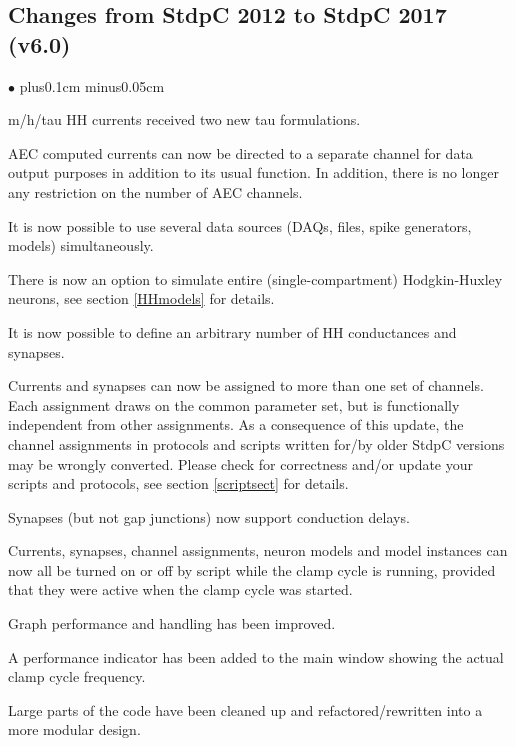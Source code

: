 \documentclass{article}
\newenvironment{myitem}{\begin{list}{$\bullet$}{\setlength{\leftmargin}{1.1em}
\itemsep0.1cm plus0.1cm minus0.05cm
\listparindent0cm
\addtolength{\labelsep}{0.5\labelsep}
\setlength{\labelwidth}{0.8em}
\setlength{\leftmargin}{\labelwidth}
\addtolength{\leftmargin}{\labelsep}
}}{\end{list}}
\begin{document}
\subsection{Changes from StdpC 2012 to StdpC 2017 (v6.0)}
\begin{myitem}
\item m/h/tau HH currents received two new tau formulations.
\item AEC computed currents can now be directed to a separate channel for data output
 purposes in addition to its usual function. In addition, there is no longer any restriction
 on the number of AEC channels.
\item It is now possible to use several data sources (DAQs, files, spike generators, models) simultaneously.
\item There is now an option to simulate entire (single-compartment) Hodgkin-Huxley neurons, see
 section \ref{HHmodels} for details.
\item It is now possible to define an arbitrary number of HH conductances and synapses.
\item Currents and synapses can now be assigned to more than one set of channels.
 Each assignment draws on the common parameter set, but is functionally independent
 from other assignments. As a consequence of this update, the channel assignments
 in protocols and scripts written for/by older StdpC versions may be wrongly converted.
 Please check for correctness and/or update your scripts and protocols, see section \ref{scriptsect} for details.
\item Synapses (but not gap junctions) now support conduction delays.
\item Currents, synapses, channel assignments, neuron models and model instances can now all be
 turned on or off by script while the clamp cycle is running, provided that they were active when
 the clamp cycle was started.
\item Graph performance and handling has been improved.
\item A performance indicator has been added to the main window showing the actual clamp cycle
frequency.
\item Large parts of the code have been cleaned up and refactored/rewritten into a more modular design.
\end{myitem}
\end{document}
